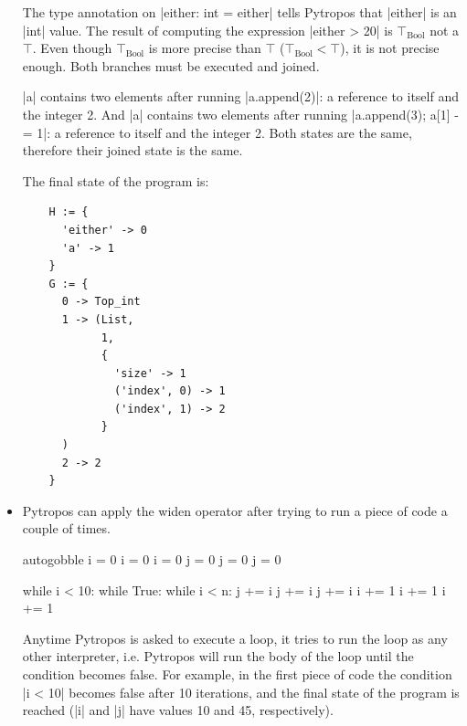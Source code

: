 \begin{itemize}
  The type annotation on \pycode|either: int = either| tells Pytropos that \pycode|either|
  is an \pycode|int| value. The result of computing the expression \pycode|either > 20| is
  $\top_{\text{Bool}}$ not a $\top$. Even though $\top_{\text{Bool}}$ is more precise than
  $\top$ ($\top_{\text{Bool}} < \top$), it is not precise enough. Both branches must be
  executed and joined.

  \pycode|a| contains two elements after running \pycode|a.append(2)|: a reference to
  itself and the integer 2.  And \pycode|a| contains two elements after running
  \pycode|a.append(3); a[1] -= 1|: a reference to itself and the integer 2. Both states
  are the same, therefore their joined state is the same.

  The final state of the program is:

  \begin{verbatim}
    H := {
      'either' -> 0
      'a' -> 1
    }
    G := {
      0 -> Top_int
      1 -> (List,
            1,
            {
              'size' -> 1
              ('index', 0) -> 1
              ('index', 1) -> 2
            }
      )
      2 -> 2
    }
  \end{verbatim}

\item Pytropos can apply the widen operator after trying to run a piece of code a couple
  of times.

  \begin{pythoncode*}{autogobble}
      i = 0             i = 0           i = 0
      j = 0             j = 0           j = 0

      while i < 10:     while True:     while i < n:
          j += i            j += i          j += i
          i += 1            i += 1          i += 1
  \end{pythoncode*}

  Anytime Pytropos is asked to execute a loop, it tries to run the loop as any other
  interpreter, i.e. Pytropos will run the body of the loop until the condition becomes
  false. For example, in the first piece of code the condition \pycode|i < 10| becomes
  false after 10 iterations, and the final state of the program is reached (\pycode|i| and
  \pycode|j| have values 10 and 45, respectively).


\end{itemize}
